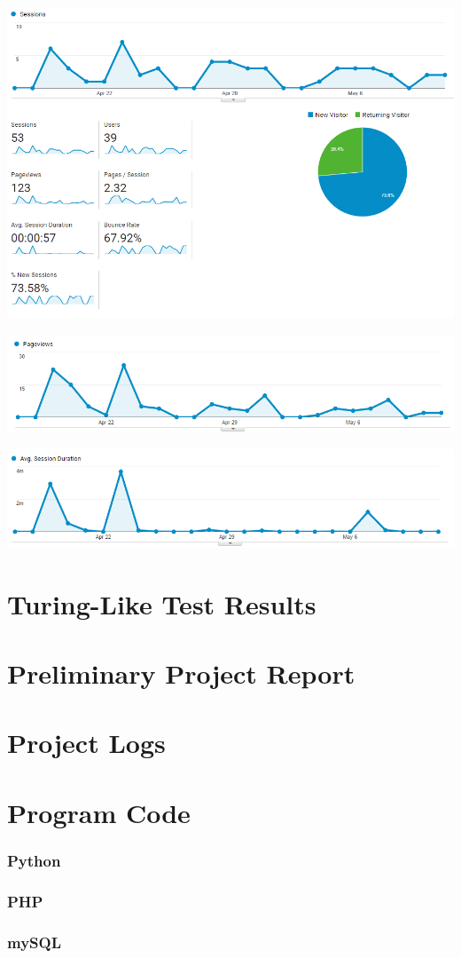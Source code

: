 \centering
\includegraphics[width=0.7\linewidth]{figures/google_analytics/uniqueSessions}
\label{fig:uniquesessions}

\centering
\includegraphics[width=0.7\linewidth]{figures/google_analytics/pageviews}
\label{fig:pageviews}

\centering
\includegraphics[width=0.7\linewidth]{figures/google_analytics/sessionDuration}
\label{fig:sessionduration}

\chapter{Turing-Like Test Results}


      


\chapter{Preliminary Project Report}






\chapter{Project Logs}


\chapter{Program Code}

\subsection{Python}
\subsection{PHP}
\subsection{mySQL}